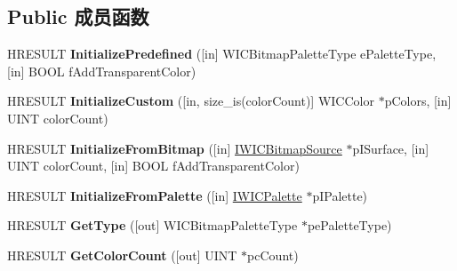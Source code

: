 \subsection*{Public 成员函数}
\begin{DoxyCompactItemize}
\item 
\mbox{\label{interface_i_w_i_c_palette_aab6038c858ad95575c01db079160ed03}} 
H\+R\+E\+S\+U\+LT {\bfseries Initialize\+Predefined} (\mbox{[}in\mbox{]} W\+I\+C\+Bitmap\+Palette\+Type e\+Palette\+Type, \mbox{[}in\mbox{]} B\+O\+OL f\+Add\+Transparent\+Color)
\item 
\mbox{\label{interface_i_w_i_c_palette_aa006a52054504ad64f201c3b162e8bf7}} 
H\+R\+E\+S\+U\+LT {\bfseries Initialize\+Custom} (\mbox{[}in, size\+\_\+is(color\+Count)\mbox{]} W\+I\+C\+Color $\ast$p\+Colors, \mbox{[}in\mbox{]} U\+I\+NT color\+Count)
\item 
\mbox{\label{interface_i_w_i_c_palette_a85f68f8cdcce42204a2fca975b9ded07}} 
H\+R\+E\+S\+U\+LT {\bfseries Initialize\+From\+Bitmap} (\mbox{[}in\mbox{]} \hyperlink{interface_i_w_i_c_bitmap_source}{I\+W\+I\+C\+Bitmap\+Source} $\ast$p\+I\+Surface, \mbox{[}in\mbox{]} U\+I\+NT color\+Count, \mbox{[}in\mbox{]} B\+O\+OL f\+Add\+Transparent\+Color)
\item 
\mbox{\label{interface_i_w_i_c_palette_abde62577287360d82d760ac487ee2d77}} 
H\+R\+E\+S\+U\+LT {\bfseries Initialize\+From\+Palette} (\mbox{[}in\mbox{]} \hyperlink{interface_i_w_i_c_palette}{I\+W\+I\+C\+Palette} $\ast$p\+I\+Palette)
\item 
\mbox{\label{interface_i_w_i_c_palette_a2ff2423c3d37dbc8f5120a38a0d478db}} 
H\+R\+E\+S\+U\+LT {\bfseries Get\+Type} (\mbox{[}out\mbox{]} W\+I\+C\+Bitmap\+Palette\+Type $\ast$pe\+Palette\+Type)
\item 
\mbox{\label{interface_i_w_i_c_palette_a381f8f05bd5b56bcdd2f93e89d14ab0a}} 
H\+R\+E\+S\+U\+LT {\bfseries Get\+Color\+Count} (\mbox{[}out\mbox{]} U\+I\+NT $\ast$pc\+Count)
\item 
\mbox{\label{interface_i_w_i_c_palette_a3c04dd801a632fdf4f9f36fe152ae11e}} 

\end{DoxyCompactItemize}
